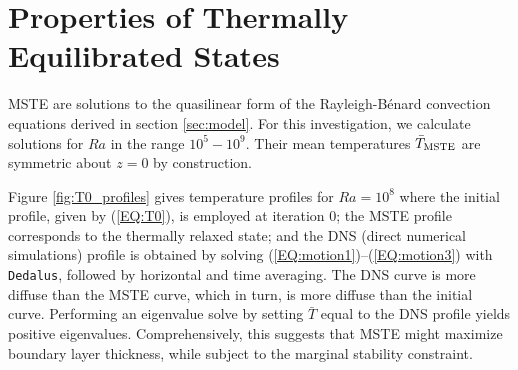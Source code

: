 \documentclass[reprint,amsmath,amssymb,aps]{revtex4-1}
\begin{document}
\section{Properties of Thermally Equilibrated States}\label{sec:properties}
MSTE are solutions to the quasilinear form of the Rayleigh-B\'enard convection equations derived in section \ref{sec:model}. 
For this investigation, we calculate solutions for $Ra$ in the range $10^5 - 10^9$. 
Their mean temperatures $\bar{T}_{\rm{MSTE}}$ are symmetric about $z = 0$ by construction. 

Figure \ref{fig:T0_profiles} gives temperature profiles for $Ra = 10^8$ where the initial profile, given by (\ref{EQ:T0}), is employed at iteration 0; the MSTE profile corresponds to the thermally relaxed state; and the DNS (direct numerical simulations) profile is obtained by solving (\ref{EQ:motion1})--(\ref{EQ:motion3}) with \texttt{Dedalus}, followed by horizontal and time averaging. 
The DNS curve is more diffuse than the MSTE curve, which in turn, is more diffuse than the initial curve. 
Performing an eigenvalue solve by setting $\bar{T}$ equal to the DNS profile yields positive eigenvalues. 
Comprehensively, this suggests that MSTE might maximize boundary layer thickness, while subject to the marginal stability constraint.
\end{document}
